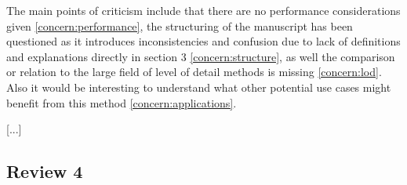 \documentclass{article}
\begin{document}
The main points of criticism include that there are no performance considerations given \eqref{concern:performance}, the structuring of the manuscript has been questioned as it introduces inconsistencies and confusion due to lack of definitions and explanations directly in section 3 \eqref{concern:structure}, as well the comparison or relation to the large field of level of detail methods is missing \eqref{concern:lod}.
Also it would be interesting to understand what other potential use cases might benefit from this method \eqref{concern:applications}.

[...]

\subsection*{Review 4}




\end{document}
